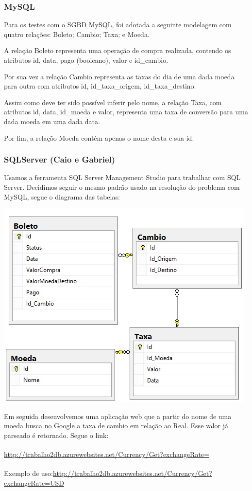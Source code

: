 \documentclass[conference]{IEEEtran}
\begin{document}
    \subsubsection{MySQL}
    Para os testes com o SGBD MySQL, foi adotada a seguinte modelagem com quatro relações: Boleto; Cambio; Taxa; e Moeda.

    A relação Boleto representa uma operação de compra realizada, contendo os atributos id, data, pago (booleano), valor e id\_cambio.

    Por sua vez a relação Cambio representa as taxas do dia de uma dada moeda para outra com atributos id, id\_taxa\_origem, id\_taxa\_destino.

    Assim como deve ter sido possível inferir pelo nome, a relação Taxa, com atributos id, data, id\_moeda e valor, representa uma taxa de conversão para uma dada moeda em uma dada data.

    Por fim, a relação Moeda contém apenas o nome desta e sua id.



    \subsubsection{SQLServer (Caio e Gabriel)}
	Usamos a ferramenta SQL Server Management Studio para trabalhar com SQL Server.			
	Decidimos seguir o mesmo padrão usado na resolução do problema com MySQL, segue o diagrama das tabelas:
 
	\includegraphics[scale=0.7]{img/tabela.jpg} 

	Em seguida desenvolvemos uma aplicação web que a partir do nome de uma moeda busca no Google a taxa de cambio em relação ao Real. Esse valor já parseado é retornado. Segue o link:\\ \\
	\href{http://trabalho2db.azurewebsites.net/Currency/Get?exchangeRate=}{http://trabalho2db.azurewebsites.net/Currency/Get?exchangeRate=} \\ \\
	Exemplo de uso:\href{http://trabalho2db.azurewebsites.net/Currency/Get?exchangeRate=USD}{http://trabalho2db.azurewebsites.net/Currency/Get?exchangeRate=USD} \\ \\
\end{document}
